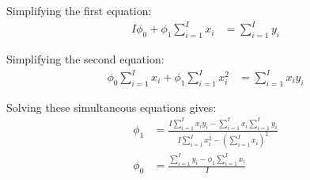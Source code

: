 \documentclass[10pt]{article}
\begin{document}
Simplifying the first equation:
\begin{align*}
I\phi_0 + \phi_1\sum_{i=1}^{I} x_i &= \sum_{i=1}^{I} y_i \tag{1}
\end{align*}

Simplifying the second equation:
\begin{align*}
\phi_0\sum_{i=1}^{I} x_i + \phi_1\sum_{i=1}^{I} x_i^2 &= \sum_{i=1}^{I} x_i y_i \tag{2}
\end{align*}

Solving these simultaneous equations gives:
\begin{align*}
\phi_1 &= \frac{I\sum_{i=1}^{I} x_i y_i - \sum_{i=1}^{I} x_i\sum_{i=1}^{I} y_i}{I\sum_{i=1}^{I} x_i^2 - {(\sum_{i=1}^{I} x_i)}^2} \\[1em]
\phi_0 &= \frac{\sum_{i=1}^{I} y_i - \phi_1\sum_{i=1}^{I} x_i}{I}
\end{align*}
\end{document}
